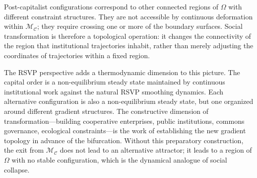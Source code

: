\documentclass[12pt,a4paper]{article}
\theoremstyle{definition}
\theoremstyle{remark}
\begin{document}
Post-capitalist configurations correspond to other connected regions of $\Omega$ with different constraint structures. They are not accessible by continuous deformation within $\mathcal{M}_\mathcal{C}$; they require crossing one or more of the boundary surfaces. Social transformation is therefore a topological operation: it changes the connectivity of the region that institutional trajectories inhabit, rather than merely adjusting the coordinates of trajectories within a fixed region.

The RSVP perspective adds a thermodynamic dimension to this picture. The capital order is a non-equilibrium steady state maintained by continuous institutional work against the natural RSVP smoothing dynamics. Each alternative configuration is also a non-equilibrium steady state, but one organized around different gradient structures. The constructive dimension of transformation---building cooperative enterprises, public institutions, commons governance, ecological constraints---is the work of establishing the new gradient topology in advance of the bifurcation. Without this preparatory construction, the exit from $\mathcal{M}_\mathcal{C}$ does not lead to an alternative attractor; it leads to a region of $\Omega$ with no stable configuration, which is the dynamical analogue of social collapse.

\newpage
\end{document}
